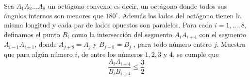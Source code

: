 Sea $A_1A_2 \dots A_8$ un octágono convexo, es decir, un octágono donde todos sus ángulos internos son menores que $180^{\circ}$. Además los lados del octágono tienen la misma longitud y cada par de lados opuestos son paralelos. Para cada $i = 1, \dots , 8$, definamos el punto $B_i$ como la intersección del segmento $A_iA_{i+4}$ con el segmento $A_{i-1}A_{i+1}$, donde $A_{j+8} = A_{j}$ y $B_{j+8} = B_j$ , para todo número entero $j$. Muestra que para algún número $i$, de entre los números $1, 2, 3$ y $4$, se cumple que
\[\frac{A_iA_{i+4}}{B_iB_{i+4}} \leq \frac{3}{2}\]